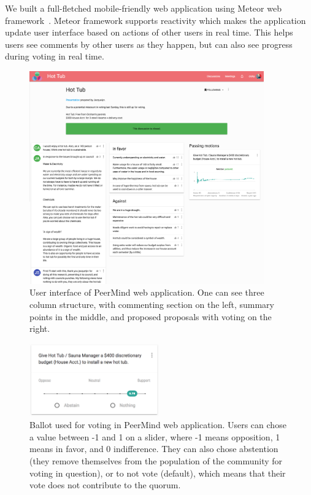 \documentclass[format=acmsmall, review=true, screen=true, anonymous=true]{acmart}
\begin{document}
We built a full-fletched mobile-friendly web application using Meteor web framework~\cite{meteor}.
Meteor framework supports reactivity which makes the application update user interface based on actions
of other users in real time. This helps users see comments by other users as they happen, but can also see
progress during voting in real time.

\begin{figure}[ht]
\centering
\includegraphics[width=0.9\textwidth]{figures/peermind.png}
\caption{User interface of PeerMind web application. One can see three column structure, with commenting
section on the left, summary points in the middle, and proposed proposals with voting on the right.}
\label{fig:peer-mind}
\end{figure}

\begin{figure}[ht]
\centering
\includegraphics[width=0.5\textwidth]{figures/ballot.png}
\caption{Ballot used for voting in PeerMind web application. Users can chose a value between -1 and 1 on a slider,
where -1 means opposition, 1 means in favor, and 0 indifference. They can also chose abstention (they
remove themselves from the population of the community for voting in question), or to not vote (default), which
means that their vote does not contribute to the quorum.}
\label{fig:ballot}
\end{figure}
\end{document}

